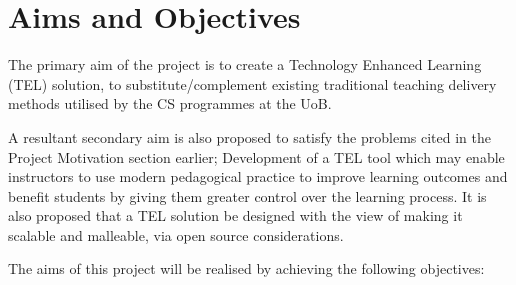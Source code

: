 \section{Aims and Objectives}
\label{sec1:sec02}

The primary aim of the project is to create a Technology Enhanced Learning (TEL) solution, to substitute/complement existing traditional teaching delivery methods utilised by the CS programmes at the UoB.

A resultant secondary aim is also proposed to satisfy the problems cited in the Project Motivation section earlier; Development of a TEL tool which may enable instructors to use modern pedagogical practice to improve learning outcomes and benefit students by giving them greater control over the learning process. It is also proposed that a TEL solution be designed with the view of making it scalable and malleable, via open source considerations.

\newpage
The aims of this project will be realised by achieving the following objectives:

